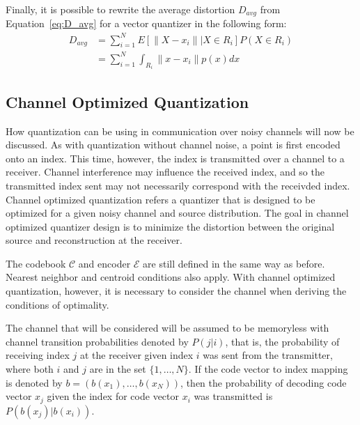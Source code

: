 \documentclass[10pt]{article}
\begin{document}
Finally, it is possible to rewrite the average distortion $D_{avg}$ from Equation~\ref{eq:D_avg} for a vector quantizer in the following form:
\begin{align}
D_{avg} &= \sum_{i=1}^{N} E[ \|X - x_i\| | X \in R_i] P(X \in R_i) \\
&= \sum_{i=1}^{N} \int_{R_i} \|x - x_i\| p(x) dx
\end{align}

\subsection{Channel Optimized Quantization}
\label{sec:channel_optimized}
How quantization can be using in communication over noisy channels will now be discussed. As with quantization without channel noise, a point is first encoded onto an index. This time, however, the index is transmitted over a channel to a receiver. Channel interference may influence the received index, and so the transmitted index sent may not necessarily correspond with the receivded index. Channel optimized quantization refers a quantizer that is designed to be optimized for a given noisy channel and source distribution. The goal in channel optimized quantizer design is to minimize the distortion between the original source and reconstruction at the receiver.

The codebook $\mathcal{C}$ and encoder $\mathcal{E}$ are still defined in the same way as before. Nearest neighbor and centroid conditions also apply. With channel optimized quantization, however, it is necessary to consider the channel when deriving the conditions of optimality.

The channel that will be considered will be assumed to be memoryless with channel transition probabilities denoted by $P(j|i)$, that is, the probability of receiving index $j$ at the receiver given index $i$ was sent from the transmitter, where both $i$ and $j$ are in the set $\{1,\ldots,N\}$. If the code vector to index mapping is denoted by $b = (b(x_1),\ldots,b(x_N))$, then the probability of decoding code vector $x_j$ given the index for code vector $x_i$ was transmitted is $P(b(x_j)|b(x_i))$.
\end{document}
